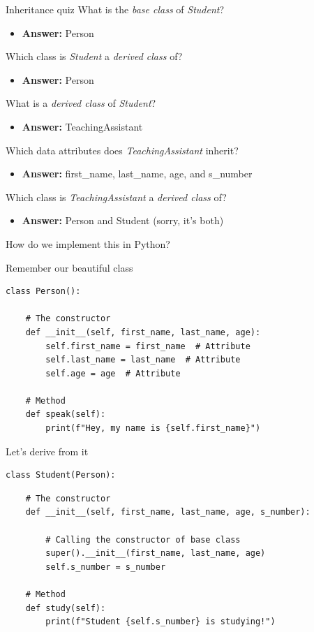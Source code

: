\begin{frame}{Inheritance quiz}
What is the \textit{base class} of \textit{Student}?
\pause
\begin{itemize}
    \item \textbf{Answer:} Person
\end{itemize}
\pause
\person
Which class is \textit{Student} a \textit{derived class} of?
\pause
\begin{itemize}
    \item \textbf{Answer:} Person
\end{itemize}
\pause
What is a \textit{derived class} of \textit{Student}?
\pause
\begin{itemize}
    \item \textbf{Answer:} TeachingAssistant
\end{itemize}
\pause
Which data attributes does \textit{TeachingAssistant} inherit?
\pause
\begin{itemize}
    \item \textbf{Answer:} first\_name, last\_name, age, and s\_number
\end{itemize}
\pause
Which class is \textit{TeachingAssistant} a \textit{derived class} of?
\pause
\begin{itemize}
    \item \textbf{Answer:} Person and Student (sorry, it's both)
\end{itemize}
\end{frame}

\begin{frame}[plain]
How do we implement this in Python?
\end{frame}

\begin{frame}[fragile]{Remember our beautiful class}
\begin{verbatim}
class Person():
    
    # The constructor
    def __init__(self, first_name, last_name, age):
        self.first_name = first_name  # Attribute
        self.last_name = last_name  # Attribute
        self.age = age  # Attribute

    # Method
    def speak(self):
        print(f"Hey, my name is {self.first_name}")
\end{verbatim}
\end{frame}

\begin{frame}[fragile]{Let's derive from it}
\begin{verbatim}
class Student(Person):

\end{verbatim}
\pause
\begin{verbatim}
    # The constructor
    def __init__(self, first_name, last_name, age, s_number):
    
        # Calling the constructor of base class
        super().__init__(first_name, last_name, age)
        self.s_number = s_number

    # Method
    def study(self):
        print(f"Student {self.s_number} is studying!")
\end{verbatim}
\end{frame}

